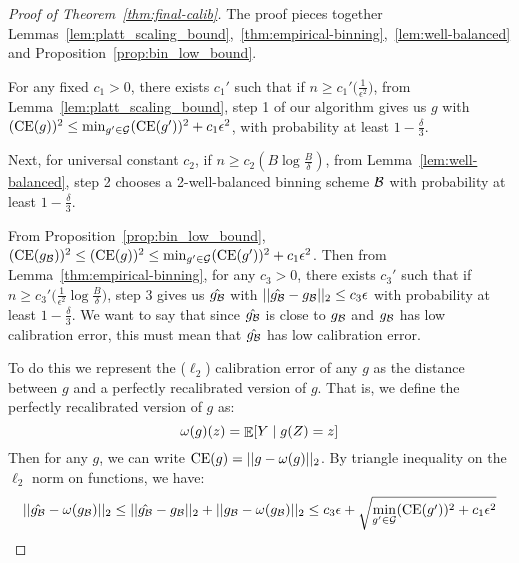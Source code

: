 \begin{proof}[Proof of Theorem~\ref{thm:final-calib}]
The proof pieces together Lemmas~\ref{lem:platt_scaling_bound},~\ref{thm:empirical-binning},~\ref{lem:well-balanced} and Proposition~\ref{prop:bin_low_bound}.

For any fixed $c_1 > 0$, there exists $c_1'$ such that if $n \geq c_1'\big(\frac{1}{\epsilon^2}\big)$, from Lemma~\ref{lem:platt_scaling_bound}, step 1 of our algorithm gives us $g$ with $(\textup{CE}(g))^2 \leq \min_{g' \in \mathcal{G}{}}(\textup{CE}(g'))^2 + c_1 \epsilon^2$, with probability at least $1 - \frac{\delta}{3}$.

Next, for universal constant $c_2$, if $n \geq c_2(B \log{\frac{B}{\delta}})$, from Lemma~\ref{lem:well-balanced}, step 2 chooses a 2-well-balanced binning scheme $\mathcal{B}{}$ with probability at least $1 - \frac{\delta}{3}$.

From Proposition~\ref{prop:bin_low_bound}, $(\textup{CE}(g_{\mathcal{B}{}}))^2 \leq (\textup{CE}(g))^2 \leq \min_{g' \in \mathcal{G}{}}(\textup{CE}(g'))^2 + c_1 \epsilon^2$. Then from Lemma~\ref{thm:empirical-binning}, for any $c_3 > 0$, there exists $c_3'$ such that if $n \geq c_3'\big(\frac{1}{\epsilon^2} \log{\frac{B}{\delta}}\big)$, step 3 gives us $\hat{g_{\mathcal{B}{}}}$ with $||\hat{g_{\mathcal{B}{}}} - g_{\mathcal{B}{}}||_2 \leq c_3 \epsilon$ with probability at least $1 - \frac{\delta}{3}$. We want to say that since $\hat{g_{\mathcal{B}{}}}$ is close to $g_{\mathcal{B}{}}$ and $g_{\mathcal{B}{}}$ has low calibration error, this must mean that $\hat{g_{\mathcal{B}{}}}$ has low calibration error.

To do this we represent the ($\ell_2$) calibration error of any $g$ as the distance between $g$ and a perfectly recalibrated version of $g$. That is, we define the perfectly recalibrated version of $g$ as:
\[ \omega(g)(z) = \mathop{\mathbb{E}}[ Y \mid g(Z) = z ] \]
Then for any $g$, we can write $\textup{CE}(g) = ||g - \omega(g)||_2$. By triangle inequality on the $\ell_2$ norm on functions, we have:
\[ ||\hat{g_{\mathcal{B}{}}} - \omega(g_{\mathcal{B}{}})||_2 \leq ||\hat{g_{\mathcal{B}{}}} - g_{\mathcal{B}{}}||_2 + ||g_{\mathcal{B}{}} - \omega(g_{\mathcal{B}{}})||_2 \leq c_3 \epsilon + \sqrt{\min_{g' \in \mathcal{G}{}}(\textup{CE}(g'))^2 + c_1 \epsilon^2} \]


\end{proof}

